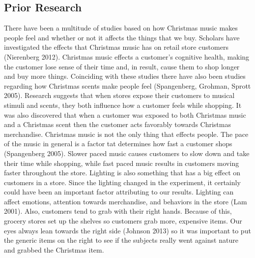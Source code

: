 \documentclass[twoside]{article}
\begin{document}
\begin{multicols}{2}
\subsection{Prior Research}
There have been a multitude of studies based on how Christmas music makes people feel and whether or not it affects the things that we buy. Scholars have investigated the effects that Christmas music has on retail store customers (Nierenberg 2012). Christmas music effects a customer's cognitive health, making the customer lose sense of their time and, in result, cause them to shop longer and buy more things. Coinciding with these studies there have also been studies regarding how Christmas scents make people feel (Spangenberg, Grohman, Sprott 2005). Research suggests that when stores expose their customers to musical stimuli and scents, they both influence how a customer feels while shopping. It was also discovered that when a customer was exposed to both Christmas music and a Christmas scent then the customer acts favorably towards Christmas merchandise. Christmas music is not the only thing that effects people. The pace of the music in general is a factor tat determines how fast a customer shops (Spangenberg 2005). Slower paced music causes customers to slow down and take their time while shopping, while fast paced music results in customers moving faster throughout the store. Lighting is also something that has a big effect on customers in a store. Since the lighting changed in the experiment, it certainly could have been an important factor attributing to our results. Lighting can affect emotions, attention towards merchandise, and behaviors in the store (Lam 2001). Also, customers tend to grab with their right hands. Because of this, grocery stores set up the shelves so customers grab more, expensive items. Our eyes always lean towards the right side (Johnson 2013)
so it was important to put the generic items on the right to see if the subjects really went against nature and grabbed the Christmas item.




\end{multicols}
\end{document}
